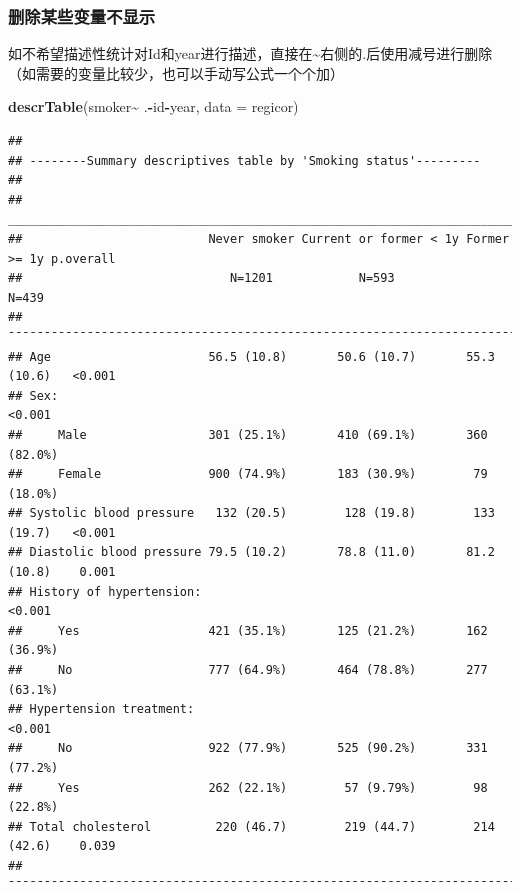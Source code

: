 \documentclass[
]{article}
\newenvironment{Shaded}{\begin{snugshade}}{\end{snugshade}}
\newcommand{\AttributeTok}[1]{\textcolor[rgb]{0.13,0.29,0.53}{#1}}
\newcommand{\FunctionTok}[1]{\textcolor[rgb]{0.13,0.29,0.53}{\textbf{#1}}}
\newcommand{\NormalTok}[1]{#1}
\newcommand{\SpecialCharTok}[1]{\textcolor[rgb]{0.81,0.36,0.00}{\textbf{#1}}}
\newcommand{\StringTok}[1]{\textcolor[rgb]{0.31,0.60,0.02}{#1}}
\begin{document}
\subsubsection{\texorpdfstring{\textbf{删除某些变量不显示}}{删除某些变量不显示}}\label{ux5220ux9664ux67d0ux4e9bux53d8ux91cfux4e0dux663eux793a}

如不希望描述性统计对Id和year进行描述，直接在\textasciitilde 右侧的.后使用减号进行删除（如需要的变量比较少，也可以手动写公式一个个加）

\begin{Shaded}
\begin{Highlighting}[]
\FunctionTok{descrTable}\NormalTok{(}\StringTok{\textasciigrave{}}\AttributeTok{smoker}\StringTok{\textasciigrave{}}\SpecialCharTok{\textasciitilde{}}\NormalTok{ .}\SpecialCharTok{{-}}\NormalTok{id}\SpecialCharTok{{-}}\NormalTok{year, }\AttributeTok{data =}\NormalTok{ regicor)}
\end{Highlighting}
\end{Shaded}

\begin{verbatim}
## 
## --------Summary descriptives table by 'Smoking status'---------
## 
## ___________________________________________________________________________________ 
##                          Never smoker Current or former < 1y Former >= 1y p.overall 
##                             N=1201            N=593             N=439               
## ¯¯¯¯¯¯¯¯¯¯¯¯¯¯¯¯¯¯¯¯¯¯¯¯¯¯¯¯¯¯¯¯¯¯¯¯¯¯¯¯¯¯¯¯¯¯¯¯¯¯¯¯¯¯¯¯¯¯¯¯¯¯¯¯¯¯¯¯¯¯¯¯¯¯¯¯¯¯¯¯¯¯¯ 
## Age                      56.5 (10.8)       50.6 (10.7)       55.3 (10.6)   <0.001   
## Sex:                                                                       <0.001   
##     Male                 301 (25.1%)       410 (69.1%)       360 (82.0%)            
##     Female               900 (74.9%)       183 (30.9%)        79 (18.0%)            
## Systolic blood pressure   132 (20.5)        128 (19.8)        133 (19.7)   <0.001   
## Diastolic blood pressure 79.5 (10.2)       78.8 (11.0)       81.2 (10.8)    0.001   
## History of hypertension:                                                   <0.001   
##     Yes                  421 (35.1%)       125 (21.2%)       162 (36.9%)            
##     No                   777 (64.9%)       464 (78.8%)       277 (63.1%)            
## Hypertension treatment:                                                    <0.001   
##     No                   922 (77.9%)       525 (90.2%)       331 (77.2%)            
##     Yes                  262 (22.1%)        57 (9.79%)        98 (22.8%)            
## Total cholesterol         220 (46.7)        219 (44.7)        214 (42.6)    0.039   
## ¯¯¯¯¯¯¯¯¯¯¯¯¯¯¯¯¯¯¯¯¯¯¯¯¯¯¯¯¯¯¯¯¯¯¯¯¯¯¯¯¯¯¯¯¯¯¯¯¯¯¯¯¯¯¯¯¯¯¯¯¯¯¯¯¯¯¯¯¯¯¯¯¯¯¯¯¯¯¯¯¯¯¯
\end{verbatim}
\end{document}

